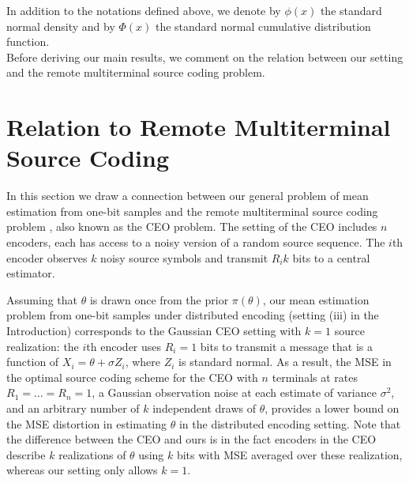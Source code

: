 \documentclass[letterpaper, conference,9pt]{IEEEtran}      %
\begin{document}

In addition to the notations defined above, we denote by $\phi(x)$ the standard normal density and by $\Phi(x)$ the standard normal cumulative distribution function. \\%

Before deriving our main results, we comment on the relation between our setting and the remote multiterminal source coding problem. 

\section{Relation to Remote Multiterminal Source Coding \label{sec:ceo}}
In this section we draw a connection between our general problem of mean estimation from one-bit samples and the remote multiterminal source coding problem \cite{berger1996ceo}, also known as the CEO problem. The setting of the CEO includes $n$ encoders, each has access to a noisy version of a random source sequence. 
The $i$th encoder observes $k$ noisy source symbols and transmit $R_i k$ bits to a central estimator. \par
Assuming that $\theta$ is drawn once from the prior $\pi(\theta)$, our mean estimation problem from one-bit samples under distributed encoding (setting (iii) in the Introduction) corresponds to the Gaussian CEO setting with $k=1$ source realization: the $i$th encoder uses $R_i=1$ bits to transmit a message that is a function of $X_i = \theta + \sigma Z_i$, where $Z_i$ is standard normal. As a result, the MSE in the optimal source coding scheme for the CEO with $n$ terminals at rates $R_1 = \ldots = R_n = 1$, a Gaussian observation noise at each estimate of variance $\sigma^2$, and an arbitrary number of $k$ independent draws of $\theta$, provides a lower bound on the MSE distortion in estimating $\theta$ in the distributed encoding setting. Note that the difference between the CEO and ours is in the fact encoders in the CEO describe $k$ realizations of $\theta$ using $k$ bits with MSE averaged over these realization, whereas our setting only allows $k=1$. 
 \\
\end{document}
